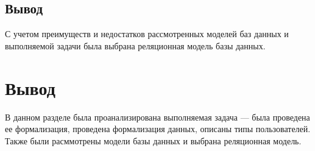 \subsection*{Вывод}

С учетом преимуществ и недостатков рассмотренных моделей баз данных и выполняемой задачи была выбрана реляционная модель базы данных.


\section{Вывод}

В данном разделе была проанализирована выполняемая задача --- была проведена ее формализация, проведена формализация данных, описаны типы пользователей. Также были расммотрены модели базы данных и выбрана реляционная модель.
